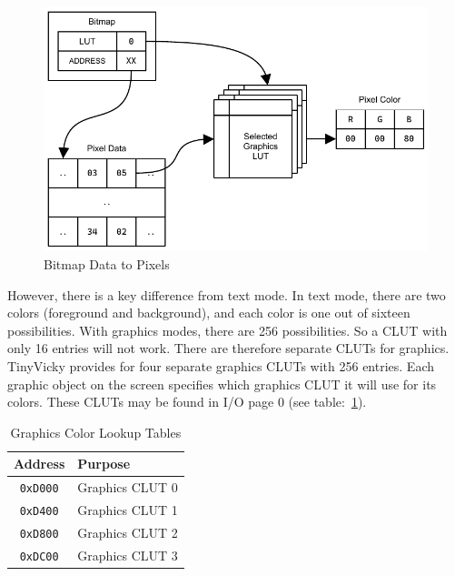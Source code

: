 \begin{figure}[h]
    \begin{center}
        \includegraphics{images/bitmaps.pdf}
    \end{center}
    \caption{Bitmap Data to Pixels}
    \label{fig:bitmap_colors}
\end{figure}

However, there is a key difference from text mode. In text mode, there are two colors (foreground and background), and each color is one out of sixteen possibilities. With graphics modes, there are 256 possibilities. So a CLUT with only 16 entries will not work. There are therefore separate CLUTs for graphics. TinyVicky provides for four separate graphics CLUTs with 256 entries. Each graphic object on the screen specifies which graphics CLUT it will use for its colors. These CLUTs may be found in I/O page 0 (see table:~\ref{tab:graph_cluts}).

\begin{table}[h]
    \begin{center}
        \begin{tabular}{|c|l|} \hline
            Address & Purpose \\\hline\hline
            \verb+0xD000+ & Graphics CLUT 0 \\ \hline
            \verb+0xD400+ & Graphics CLUT 1 \\ \hline
            \verb+0xD800+ & Graphics CLUT 2 \\ \hline
            \verb+0xDC00+ & Graphics CLUT 3 \\ \hline
        \end{tabular}
    \end{center}
    \caption{Graphics Color Lookup Tables}
    \label{tab:graph_cluts}
\end{table}

